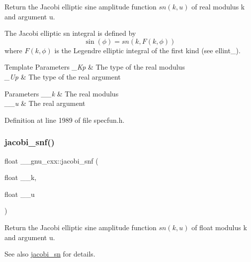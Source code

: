 Return the Jacobi elliptic sine amplitude function $ sn(k,u) $ of real modulus {\ttfamily k} and argument {\ttfamily u}.

The Jacobi elliptic {\ttfamily sn} integral is defined by \[ \sin(\phi) = sn(k, F(k,\phi)) \] where $ F(k,\phi) $ is the Legendre elliptic integral of the first kind (see ellint\+\_).


\begin{DoxyTemplParams}{Template Parameters}
{\em \+\_\+\+Kp} & The type of the real modulus \\
\hline
{\em \+\_\+\+Up} & The type of the real argument \\
\hline
\end{DoxyTemplParams}

\begin{DoxyParams}{Parameters}
{\em \+\_\+\+\_\+k} & The real modulus \\
\hline
{\em \+\_\+\+\_\+u} & The real argument \\
\hline
\end{DoxyParams}


Definition at line 1989 of file specfun.\+h.

\mbox{\label{group__mathsf__gnu_ga5981245b7343da6e21d445bb01fdba9c}} 
\subsubsection{\texorpdfstring{jacobi\+\_\+snf()}{jacobi\_snf()}}
{\footnotesize\ttfamily float \+\_\+\+\_\+gnu\+\_\+cxx\+::jacobi\+\_\+snf (\begin{DoxyParamCaption}\item[{float}]{\+\_\+\+\_\+k,  }\item[{float}]{\+\_\+\+\_\+u }\end{DoxyParamCaption})\hspace{0.3cm}{\ttfamily [inline]}}

Return the Jacobi elliptic sine amplitude function $ sn(k,u) $ of {\ttfamily float} modulus {\ttfamily k} and argument {\ttfamily u}.

\begin{DoxySeeAlso}{See also}
\hyperlink{group__mathsf__gnu_ga49d5e18152dd0dd0f496b8c8582e7045}{jacobi\+\_\+sn} for details. 
\end{DoxySeeAlso}


